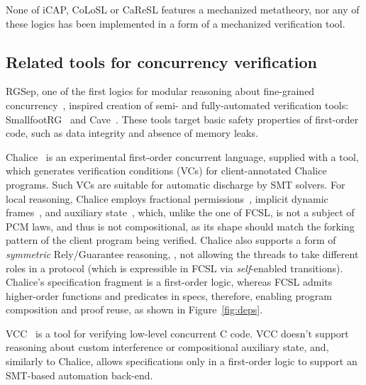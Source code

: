 None of iCAP, CoLoSL or CaReSL features a mechanized metatheory,
nor any of these logics has been implemented in a form of a mechanized
verification tool.


\subsection{Related tools for concurrency verification}
%
RGSep, one of the first logics for modular reasoning about
fine-grained concurrency~\cite{Vafeiadis-Parkinson:CONCUR07}, inspired
creation of semi- and fully-automated verification tools:
SmallfootRG~\cite{Calcagno-al:SAS07} and
Cave~\cite{Vafeiadis:VMCAI10}.
%
These tools target basic safety properties of first-order code,  such
as data integrity and absence of memory leaks.

Chalice~\cite{Leino-Muller:ESOP09} is an experimental first-order
concurrent language, supplied with a tool, which generates
verification conditions (VCs) for client-annotated Chalice
programs. Such VCs are suitable for automatic discharge by SMT
solvers.
%
%
%
For local reasoning, Chalice employs fractional
permissions~\cite{Bornat-al:POPL05}, implicit dynamic
frames~\cite{Smans-al:ECOOP09}, and auxiliary
state~\cite{Leino-al:FOSAD09}, which, unlike the one of FCSL, is not a
subject of PCM laws, and thus is not compositional, as its shape
should match the forking pattern of the client program being verified.
%
Chalice also supports a form of \emph{symmetric} Rely/Guarantee
reasoning, \ie, not allowing the threads to take different roles in a
protocol (which is expressible in FCSL via \emph{self}-enabled
transitions).
%
Chalice's specification fragment is a first-order logic, whereas FCSL
admits higher-order functions and predicates in specs, therefore,
enabling program composition and proof reuse, as shown in
Figure~\ref{fig:deps}.

VCC~\cite{Cohen-al:TPHOL09} is a tool for verifying low-level
concurrent C code. VCC doesn't support reasoning about custom
interference or compositional auxiliary state, and, similarly to
Chalice, allows specifications only in a first-order logic to support
an SMT-based automation back-end.

